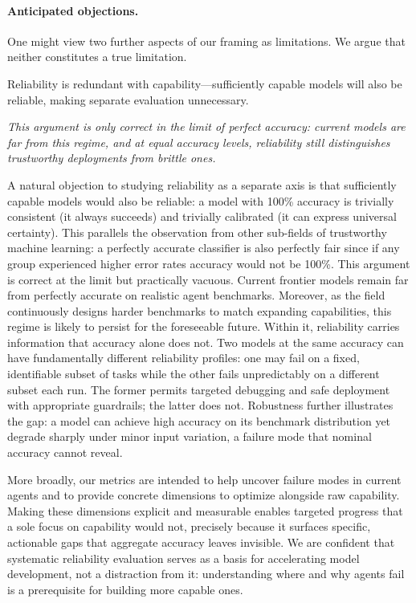 \documentclass[11pt]{article}
\newcounter{dimension}
\newcounter{objection}
\newcommand{\rebuttal}[1]{\noindent\textit{\textrightarrow\space #1}\par\smallskip}
\begin{document}
\paragraph{Anticipated objections.}
One might view two further aspects of our framing as limitations. We argue that neither constitutes a true limitation.

\begin{objectionbox}
Reliability is redundant with capability---sufficiently capable models will also be reliable, making separate evaluation unnecessary.
\end{objectionbox}
\rebuttal{This argument is only correct in the limit of perfect accuracy: current models are far from this regime, and at equal accuracy levels, reliability still distinguishes trustworthy deployments from brittle ones.}
A natural objection to studying reliability as a separate axis is that sufficiently capable models would also be reliable: a model with 100\% accuracy is trivially consistent (it always succeeds) and trivially calibrated (it can express universal certainty). This parallels the observation from other sub-fields of trustworthy machine learning: a perfectly accurate classifier is also perfectly fair since if any group experienced higher error rates accuracy would not be 100\%. This argument is correct at the limit but practically vacuous. Current frontier models remain far from perfectly accurate on realistic agent benchmarks. Moreover, as the field continuously designs harder benchmarks to match expanding capabilities, this regime is likely to persist for the foreseeable future. Within it, reliability carries information that accuracy alone does not. Two models at the same accuracy can have fundamentally different reliability profiles: one may fail on a fixed, identifiable subset of tasks while the other fails unpredictably on a different subset each run. The former permits targeted debugging and safe deployment with appropriate guardrails; the latter does not. Robustness further illustrates the gap: a model can achieve high accuracy on its benchmark distribution yet degrade sharply under minor input variation, a failure mode that nominal accuracy cannot reveal. 

More broadly, our metrics are intended to help uncover failure modes in current agents and to provide concrete dimensions to optimize alongside raw capability. Making these dimensions explicit and measurable enables targeted progress that a sole focus on capability would not, precisely because it surfaces specific, actionable gaps that aggregate accuracy leaves invisible. We are confident that systematic reliability evaluation serves as a basis for accelerating model development, not a distraction from it: understanding where and why agents fail is a prerequisite for building more capable ones.
\end{document}
